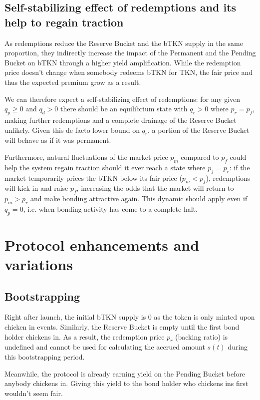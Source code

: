 \documentclass{article}
\begin{document}
\subsection{Self-stabilizing effect of redemptions and its help to regain traction}
  \label{sec:self-stabilizing}
As redemptions reduce the Reserve Bucket and the bTKN supply in the same proportion, they indirectly increase the impact of the Permanent and the Pending Bucket on bTKN through a higher yield amplification. While the redemption price doesn't change when somebody redeems bTKN for TKN, the fair price and thus the expected premium grow as a result. 

We can therefore expect a self-stabilizing effect of redemptions: for any given $q_p \geq 0$ and $q_d > 0$ there should be an equilibrium state with $q_r > 0$ where $p_r = p_f$, making further redemptions and a complete drainage of the Reserve Bucket unlikely. Given this de facto lower bound on $q_r$, a portion of the Reserve Bucket will behave as if it was permanent.

Furthermore, natural fluctuations of the market price $p_m$ compared to $p_f$ could help the system regain traction should it ever reach a state where $p_f = p_r$: if the market temporarily prices the bTKN below its fair price ($p_m < p_f$), redemptions will kick in and raise $p_f$, increasing the odds that the market will return to $p_m > p_r$ and make bonding attractive again. This dynamic should apply even if $q_p = 0$, i.e. when bonding activity has come to a complete halt.

\section{Protocol enhancements and variations}
\subsection{Bootstrapping}
  \label{sec:bootstrapping}
Right after launch, the initial bTKN supply is 0 as the token is only minted upon chicken in events. Similarly, the Reserve Bucket is empty until the first bond holder chickens in. As a result, the redemption price $p_r$ (backing ratio) is undefined and cannot be used for calculating the accrued amount $s(t)$ during this bootstrapping period.

Meanwhile, the protocol is already earning yield on the Pending Bucket before anybody chickens in. Giving this yield to the bond holder who chickens ins first wouldn't seem fair. 
\end{document}
